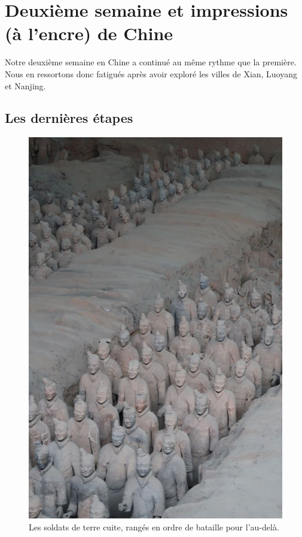 \hypertarget{deuxiuxe8me-semaine-et-impressions-uxe0-lencre-de-chine}{%
\section{Deuxième semaine et impressions (à l'encre) de
Chine}\label{deuxiuxe8me-semaine-et-impressions-uxe0-lencre-de-chine}}

Notre deuxième semaine en Chine a continué au même rythme que la
première. Nous en ressortons donc fatigués après avoir exploré les
villes de Xian, Luoyang et Nanjing.

\hypertarget{les-derniuxe8res-uxe9tapes}{%
\subsection{Les dernières étapes}\label{les-derniuxe8res-uxe9tapes}}

\begin{figure}
\centering
\includegraphics{images/20180622_terracotta.JPG}
\caption{Les soldats de terre cuite, rangés en ordre de bataille pour
l'au-delà.}
\end{figure}

